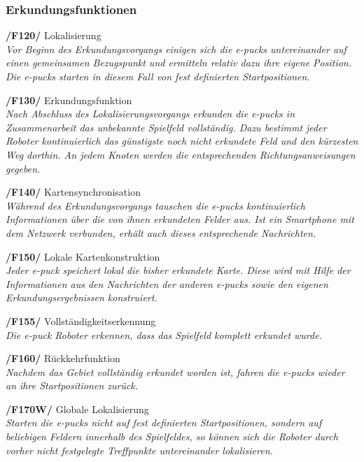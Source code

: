 \documentclass[10pt,a4paper]{article}
\begin{document}
			\subsubsection{Erkundungsfunktionen}
				\begin{list}{}{\leftmargin=1cm}
					\item[\textbf{/F120/}] Lokalisierung
						\\ \textsl{Vor Beginn des Erkundungsvorgangs einigen sich die e-pucks untereinander auf einen gemeinsamen Bezugspunkt
						und ermitteln relativ dazu ihre eigene Position. Die e-pucks starten in diesem Fall von fest definierten Startpositionen.}
					\item[\textbf{/F130/}] Erkundungsfunktion
						\\ \textsl{Nach Abschluss des Lokalisierungsvorgangs erkunden die e-pucks in Zusammenarbeit das unbekannte
							Spielfeld vollständig. Dazu bestimmt jeder Roboter kontinuierlich das günstigste noch nicht erkundete Feld und den
							kürzesten Weg dorthin. An jedem Knoten werden die entsprechenden Richtungsanweisungen gegeben.}
					\item[\textbf{/F140/}] Kartensynchronisation
						\\ \textsl{Während des Erkundungsvorgangs tauschen die e-pucks kontinuierlich Informationen über die von ihnen
						erkundeten Felder aus. Ist ein Smartphone mit dem Netzwerk verbunden, erhält auch dieses entsprechende Nachrichten.}
					\item[\textbf{/F150/}] Lokale Kartenkonstruktion	
						\\ \textsl{Jeder e-puck speichert lokal die bisher erkundete Karte. Diese wird mit Hilfe
						der Informationen aus den Nachrichten der anderen e-pucks sowie den eigenen Erkundungsergebnissen konstruiert.} 				
					\item[\textbf{/F155/}] Vollständigkeitserkennung 
						\\ \textsl{Die e-puck Roboter erkennen, dass das Spielfeld komplett erkundet wurde.} 	
					\item[\textbf{/F160/}] Rückkehrfunktion
						\\ \textsl{Nachdem das Gebiet vollständig erkundet worden ist, fahren die e-pucks wieder an ihre Startpositionen
						zurück.}
					\item[\textbf{/F170W/}] Globale Lokalisierung
						\\ \textsl{Starten die e-pucks nicht auf fest definierten Startpositionen, sondern auf beliebigen Feldern innerhalb
							des Spielfeldes, so können sich die Roboter durch vorher nicht festgelegte Treffpunkte untereinander lokalisieren.}
				\end{list}
\end{document}
